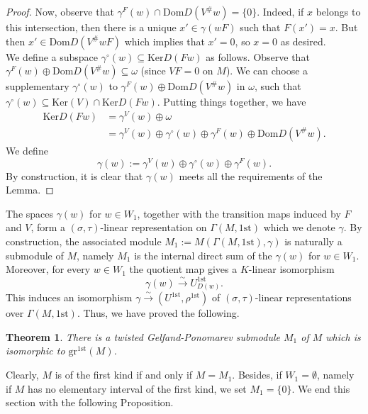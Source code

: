 \documentclass[12pt]{amsart}
\newtheorem{theorem}{Theorem}[section]
\theoremstyle{definition}
\newcommand{\<}{\langle}   %
\renewcommand{\>}{\rangle} %
\begin{document}
\begin{proof}
Now, observe that $\gamma^F(w) \cap \mathrm{Dom}D(V^{\#}w) = \{0\}$. Indeed, if $x$ belongs to this intersection, then there is a unique $x' \in \gamma(wF)$ such that $F(x') = x$. But then $x' \in \mathrm{Dom} D(V^{\#}wF)$ which implies that $x' = 0$, so $x=0$ as desired. \\
We define a subspace $\gamma^{\circ}(w) \subseteq  \mathrm{Ker}D(Fw)$ as follows. Observe that $\gamma^F(w) \oplus \mathrm{Dom}D(V^{\#}w) \subseteq  \omega$ (since $VF = 0$ on $M$). We can choose a supplementary $\gamma^{\circ}(w)$ to $\gamma^F(w) \oplus \mathrm{Dom}D(V^{\#}w)$ in $\omega$, such that $\gamma^{\circ}(w) \subseteq  \mathrm{Ker}(V) \cap \mathrm{Ker} D(Fw)$. Putting things together, we have 
\begin{align*}
    \mathrm{Ker} D(Fw) & = \gamma^V(w) \oplus \omega \\
    & = \gamma^V(w) \oplus \gamma^{\circ}(w) \oplus \gamma^F(w) \oplus \mathrm{Dom}D(V^{\#}w).
\end{align*}
We define 
\begin{equation*}
    \gamma(w) := \gamma^V(w) \oplus \gamma^{\circ}(w) \oplus \gamma^F(w).
\end{equation*}
By construction, it is clear that $\gamma(w)$ meets all the requirements of the Lemma.
\end{proof}

The spaces $\gamma(w)$ for $w \in W_1$, together with the transition maps induced by $F$ and $V$, form a $(\sigma,\tau)$-linear representation on $\Gamma(M,1\mathrm{st})$ which we denote $\gamma$. By construction, the associated module $M_1 := M(\Gamma(M,1\mathrm{st}),\gamma)$ is naturally a submodule of $M$, namely $M_1$ is the internal direct sum of the $\gamma(w)$ for $w \in W_1$. Moreover, for every $w \in W_1$ the quotient map gives a $K$-linear isomorphism 
\begin{equation*}
    \gamma(w) \xrightarrow{\sim} U_{D(w)}^{1\mathrm{st}}.
\end{equation*}
This induces an isomorphism $\gamma \xrightarrow{\sim} (U^{1\mathrm{st}},\rho^{1\mathrm{st}})$ of $(\sigma,\tau)$-linear representations over $\Gamma(M,1\mathrm{st})$. Thus, we have proved the following.

\begin{theorem}\label{TheoremExistenceM1}
    There is a twisted Gelfand-Ponomarev submodule $M_1$ of $M$ which is isomorphic to $\mathrm{gr}^{1\mathrm{st}}(M)$. 
\end{theorem}

Clearly, $M$ is of the first kind if and only if $M = M_1$. Besides, if $W_1 = \emptyset$, namely if $M$ has no elementary interval of the first kind, we set $M_1 = \{0\}$. We end this section with the following Proposition.
\end{document}
